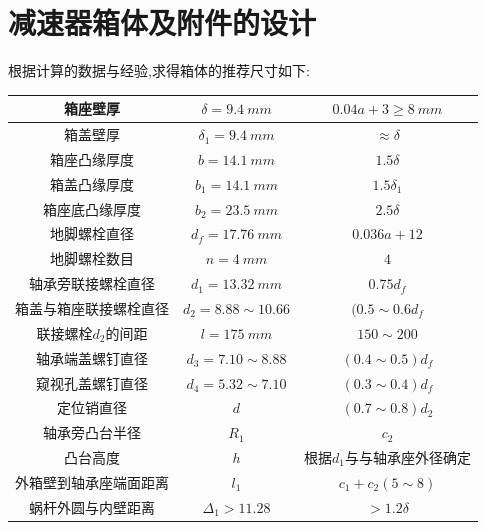 \documentclass[UTF8,11pt,a4paper,oneside,final,zihao=-4,]{ctexrep}%
\begin{document}
	\chapter{减速器箱体及附件的设计}
		根据计算的数据与经验,求得箱体的推荐尺寸如下:
	\begin{table}[h]\centering  %
		
		\begin{tabular}{c|c|c}
			\hline
			箱座壁厚               & $\delta=9.4\ mm$    & $0.04a+3\ge8\ mm$           \\ \hline
			箱盖壁厚               & $\delta_1=9.4\ mm$  & $ \approx \delta $          \\ \hline
			箱座凸缘厚度           & $b=14.1\ mm$        & $1.5\delta$                 \\ \hline
			箱盖凸缘厚度           & $b_1=14.1\ mm$      & $1.5\delta_1$               \\ \hline
			箱座底凸缘厚度         & $b_2=23.5\ mm$      & $2.5\delta$                 \\ \hline
			地脚螺栓直径           & $d_f=17.76\ mm$     & $0.036a+12$                 \\ \hline
			地脚螺栓数目           & $n=4\ mm$           & $4$                         \\ \hline
			轴承旁联接螺栓直径     & $d_1=13.32\ mm$     & $0.75d_f$                   \\ \hline
			箱盖与箱座联接螺栓直径 & $d_2=8.88\sim10.66$ & $(0.5\sim 0.6 d_f$          \\ \hline
			联接螺栓$d_2$的间距    & $l=175\ mm$         & $150\sim 200$               \\ \hline
			轴承端盖螺钉直径       & $d_3=7.10\sim8.88$  & $(0.4\sim 0.5) d_f$         \\ \hline
			窥视孔盖螺钉直径       & $d_4=5.32\sim7.10$  & $(0.3\sim 0.4) d_f$         \\ \hline
			定位销直径             & $d$                 & $(0.7\sim0.8) d_2$          \\ \hline
			轴承旁凸台半径         & $R_1$               & $c_2$                       \\ \hline
			凸台高度               & $h$                 & $根据d_1与与轴承座外径确定$ \\ \hline
			外箱壁到轴承座端面距离 & $l_1$               & $c_1+c_2(5\sim 8)$          \\ \hline
			蜗杆外圆与内壁距离     & $\Delta_1>11.28$    & $>1.2\delta$                \\ \hline

\end{tabular}
\end{table}
\end{document}
